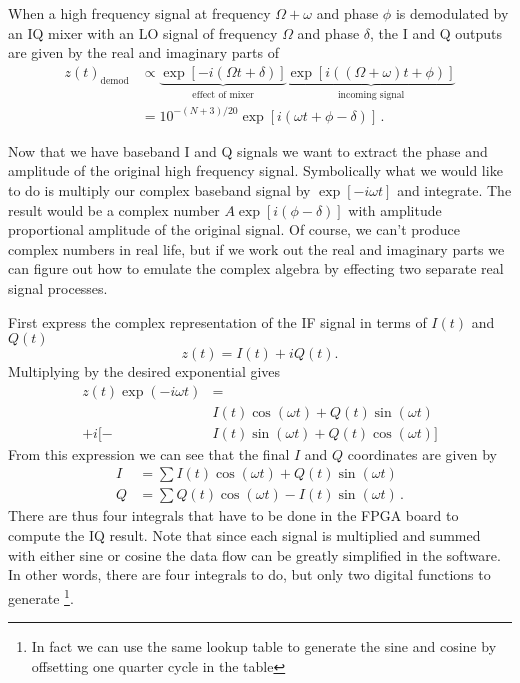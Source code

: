 
When a high frequency signal at frequency $\Omega+\omega$ and phase $\phi$ is demodulated by an IQ mixer with an LO signal of frequency $\Omega$ and phase $\delta$, the I and Q outputs are given by the real and imaginary parts of
\begin{align}
z(t)_{\textrm{demod}} &\propto \underbrace{\exp \left[-i \left( \Omega t + \delta \right) \right]}_{\textrm{effect of mixer}} \underbrace{\exp \left[ i \left( \left( \Omega + \omega \right) t + \phi \right) \right]}_{\textrm{incoming signal}} \nonumber \\
&= 10^{-(N+3)/20} \exp \left[ i \left( \omega t + \phi-\delta \right) \right] \, . \nonumber
\end{align}


Now that we have baseband I and Q signals we want to extract the phase and amplitude of the original high frequency signal.
Symbolically what we would like to do is multiply our complex baseband signal by $\exp \left[ -i \omega t \right]$ and integrate.
The result would be a complex number $A \exp \left[ i \left( \phi - \delta \right) \right]$ with amplitude proportional amplitude of the original signal.
Of course, we can't produce complex numbers in real life, but if we work out the real and imaginary parts we can figure out how to emulate the complex algebra by effecting two separate real signal processes.

First express the complex representation of the IF signal in terms of $I(t)$ and $Q(t)$ \begin{equation}
z(t) = I(t) + iQ(t). \end{equation}
Multiplying by the desired exponential gives \begin{align}
z(t) \exp \left(-i \omega t \right) &= \nonumber \\
        & I(t) \cos (\omega t) + Q(t) \sin (\omega t) \nonumber \\
+ i [ - & I(t) \sin (\omega t) + Q(t) \cos (\omega t) ] \end{align}
From this expression we can see that the final $I$ and $Q$ coordinates are given by \begin{align}
I &= \sum I(t)\cos(\omega t) + Q(t) \sin(\omega t) \\
Q &= \sum Q(t)\cos(\omega t) - I(t) \sin(\omega t) \, .
\end{align}
There are thus four integrals that have to be done in the FPGA board to compute the IQ result. Note that since each signal is multiplied and summed with either sine or cosine the data flow can be greatly simplified in the software. In other words, there are four integrals to do, but only two digital functions to generate \footnote{In fact we can use the same lookup table to generate the sine and cosine by offsetting one quarter cycle in the table}.

